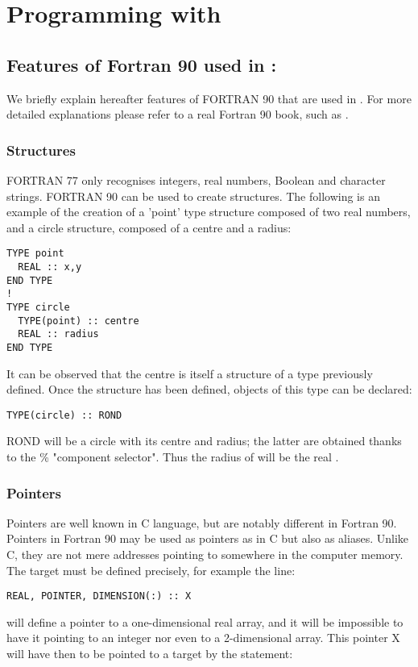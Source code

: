 \chapter{Programming with \bief}
\label{ref:programmingbief}
%
%
%
\section{Features of Fortran 90 used in \bief:}
%
We briefly explain hereafter features of FORTRAN 90 that are used in \bief. For
more detailed explanations please refer to a real Fortran 90 book, such as
\citet{Metcalf1990}.

\subsection{Structures}

FORTRAN 77 only recognises integers, real numbers, Boolean and character
strings. FORTRAN 90 can be used to create structures. The following is an
example of the creation of a 'point' type structure composed of two real
numbers, and a circle structure, composed of a centre and a radius:

\begin{lstlisting}[language=TelFortran]
TYPE point
  REAL :: x,y
END TYPE
!
TYPE circle
  TYPE(point) :: centre
  REAL :: radius
END TYPE
\end{lstlisting}

It can be observed that the centre is itself a structure of a type previously
defined. Once the structure has been defined, objects of this type can be
declared:
\begin{lstlisting}[language=TelFortran]
TYPE(circle) :: ROND
\end{lstlisting}
ROND will be a circle with its centre and radius; the latter are obtained
thanks to the \% "component selector". Thus the radius of  will be
the real .

\subsection{Pointers}

Pointers are well known in C language, but are notably different in Fortran 90.
Pointers in Fortran 90 may be used as pointers as in C but also as aliases.
Unlike C, they are not mere addresses pointing to somewhere in the computer
memory. The target must be defined precisely, for example the line:

\begin{lstlisting}[language=TelFortran]
REAL, POINTER, DIMENSION(:) :: X
\end{lstlisting}
will define a pointer to a one-dimensional real array, and it will be
impossible to have it pointing to an integer nor even to a 2-dimensional array.
This pointer X will have then to be pointed to a target by the statement:



